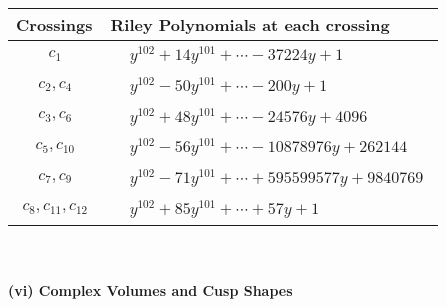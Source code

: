 \documentclass[1p]{elsarticle_modified}
\theoremstyle{definition}
\begin{document}
\begin{tabular}{m{50pt}|m{274pt}}
Crossings & \hspace{64pt}Riley Polynomials at each crossing \\
\hline $$\begin{aligned}c_{1}\end{aligned}$$&$\begin{aligned}
&y^{102}+14 y^{101}+\cdots-37224 y+1
\end{aligned}$\\
\hline $$\begin{aligned}c_{2},c_{4}\end{aligned}$$&$\begin{aligned}
&y^{102}-50 y^{101}+\cdots-200 y+1
\end{aligned}$\\
\hline $$\begin{aligned}c_{3},c_{6}\end{aligned}$$&$\begin{aligned}
&y^{102}+48 y^{101}+\cdots-24576 y+4096
\end{aligned}$\\
\hline $$\begin{aligned}c_{5},c_{10}\end{aligned}$$&$\begin{aligned}
&y^{102}-56 y^{101}+\cdots-10878976 y+262144
\end{aligned}$\\
\hline $$\begin{aligned}c_{7},c_{9}\end{aligned}$$&$\begin{aligned}
&y^{102}-71 y^{101}+\cdots+595599577 y+9840769
\end{aligned}$\\
\hline $$\begin{aligned}c_{8},c_{11},c_{12}\end{aligned}$$&$\begin{aligned}
&y^{102}+85 y^{101}+\cdots+57 y+1
\end{aligned}$\\
\hline
\end{tabular}\\~\\
\newpage\flushleft \textbf{(vi) Complex Volumes and Cusp Shapes}
\end{document}
